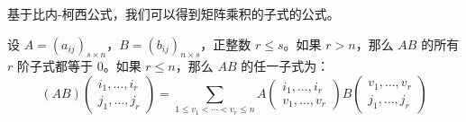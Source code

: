 
基于比内-柯西公式，我们可以得到矩阵乘积的子式的公式。

\begin{theorem}
	设 $A = (a_{ij})_{s \times n}$，$B = (b_{ij})_{n \times s}$，正整数 $r \le s$。如果 $r > n$，那么 $AB$ 的所有 $r$ 阶子式都等于 $0$。如果 $r \le n$，那么 $AB$ 的任一子式为：
	$$
	(AB) \begin{pmatrix} i_1, \ldots, i_r \\ j_1, \ldots, j_r \end{pmatrix} = \sum\limits_{1 \le v_1 < \cdots < v_r \le n} A \begin{pmatrix} i_1, \ldots, i_r \\ v_1, \ldots, v_r \end{pmatrix} B \begin{pmatrix} v_1, \ldots, v_r \\ j_1, \ldots, j_r \end{pmatrix}
	$$
\end{theorem}

